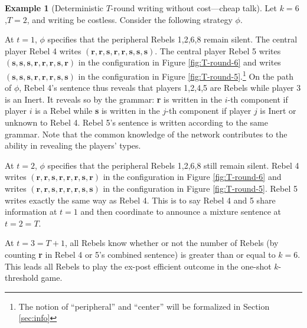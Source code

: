 \documentclass[12pt,letter]{article}
\theoremstyle{definition}
\newtheorem{example}{Example}
\theoremstyle{remark}
\theoremstyle{claim}
\begin{document}
%
\begin{example}[Deterministic $T$-round writing without cost---cheap talk]
\label{ex:cheap_talk}
Let $k=6$ ,$T=2$, and writing be costless. Consider the following strategy $\phi$. 

At $t=1$, $\phi$ specifies that the peripheral Rebels 1,2,6,8 remain silent. The central player Rebel 4 writes $(\textbf{r},\textbf{r},\textbf{s},\textbf{r},\textbf{r},\textbf{s},\textbf{s},\textbf{s})$. The central player Rebel 5 writes $(\textbf{s},\textbf{s},\textbf{s},\textbf{r},\textbf{r},\textbf{r},\textbf{s},\textbf{r})$ in the configuration in Figure \ref{fig:T-round-6} and writes $(\textbf{s},\textbf{s},\textbf{s},\textbf{r},\textbf{r},\textbf{r},\textbf{s},\textbf{s})$ in the configuration in Figure \ref{fig:T-round-5}.\footnote{The notion of ``peripheral'' and ``center'' will be formalized in Section \ref{sec:info}} On the path of $\phi$, Rebel 4's sentence thus reveals that players 1,2,4,5 are Rebels while player 3 is an Inert. It reveals so by the grammar: \textbf{r} is written in the $i$-th component if player $i$ is a Rebel while  \textbf{s} is written in the $j$-th component if player $j$ is Inert or unknown to Rebel 4. Rebel 5's sentence is written according to the same grammar. Note that the common knowledge of the network contributes to the ability in revealing the players' types. 

At $t=2$, $\phi$ specifies that the peripheral Rebels 1,2,6,8 still remain silent. Rebel 4 writes $(\textbf{r},\textbf{r},\textbf{s},\textbf{r},\textbf{r},\textbf{r},\textbf{s},\textbf{r})$ in the configuration in Figure \ref{fig:T-round-6} and writes $(\textbf{r},\textbf{r},\textbf{s},\textbf{r},\textbf{r},\textbf{r},\textbf{s},\textbf{s})$ in the configuration in Figure \ref{fig:T-round-5}. Rebel 5 writes exactly the same way as Rebel 4. This is to say Rebel 4 and 5 share information at $t=1$ and then coordinate to announce a mixture sentence at $t=2=T$. 

At $t=3=T+1$, all Rebels know whether or not the number of Rebels (by counting \textbf{r} in Rebel 4 or 5's combined sentence) is greater than or equal to $k=6$. This leads all Rebels to play the ex-post efficient outcome in the one-shot $k$-threshold game. 



\end{example}
\end{document}
